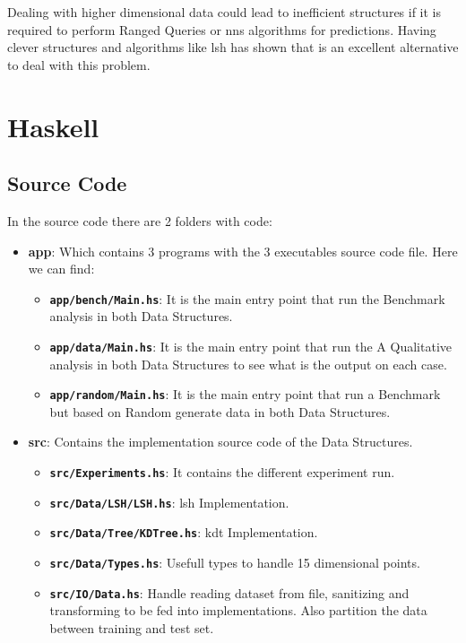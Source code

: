 \documentclass[12pt, a4paper]{article}
\begin{document}
Dealing with higher dimensional data could lead to inefficient structures if it is required to perform Ranged Queries or \acrlong{nns} algorithms for predictions. Having clever structures and algorithms like \acrfull{lsh} has shown that is an excellent alternative to deal with this problem.




\printglossary[type=\acronymtype]

\appendix\label{apx:org}
\section{Haskell}
\subsection{Source Code}
In the source code there are 2 folders with code:

\begin{itemize}
  \item \textbf{app}: Which contains 3 programs with the 3 executables source code file. Here we can find:
    \begin{itemize}
      \item \textbf{\texttt{app/bench/Main.hs}}: It is the main entry point that run the Benchmark analysis in both Data Structures.
      \item \textbf{\texttt{app/data/Main.hs}}: It is the main entry point that run the A Qualitative analysis in both Data Structures to see what is the output on each case.
      \item \textbf{\texttt{app/random/Main.hs}}: It is the main entry point that run a Benchmark but based on Random generate data in both Data Structures.
    \end{itemize}
  \item \textbf{src}: Contains the implementation source code of the Data Structures.
    \begin{itemize}
      \item \textbf{\texttt{src/Experiments.hs}}: It contains the different experiment run.
      \item \textbf{\texttt{src/Data/LSH/LSH.hs}}: \acrshort{lsh} Implementation.
      \item \textbf{\texttt{src/Data/Tree/KDTree.hs}}: \acrshort{kdt} Implementation.
      \item \textbf{\texttt{src/Data/Types.hs}}: Usefull types to handle 15 dimensional points.
      \item \textbf{\texttt{src/IO/Data.hs}}: Handle reading dataset from file, sanitizing and transforming to be fed into implementations. Also partition the data between training and test set.
    \end{itemize}

\end{itemize}
\end{document}
